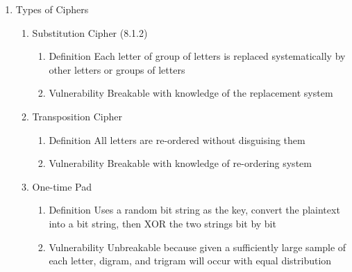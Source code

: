 \documentclass[a4paper,10pt]{article}
\begin{document}
\begin{enumerate}
  \item Types of Ciphers
    \begin{enumerate}
      \item Substitution Cipher (8.1.2)
        \begin{enumerate}
          \item Definition
            \newline Each letter of group of letters is replaced systematically by other letters or groups of letters
          \item Vulnerability
            \newline Breakable with knowledge of the replacement system
        \end{enumerate}
      \item Transposition Cipher
        \begin{enumerate}
          \item Definition
            \newline All letters are re-ordered without disguising them
          \item Vulnerability
            \newline Breakable with knowledge of re-ordering system
        \end{enumerate}
      \item One-time Pad
        \begin{enumerate}
          \item Definition
            \newline Uses a random bit string as the key, convert the plaintext into a bit string, then XOR the two strings bit by bit
          \item Vulnerability
            \newline Unbreakable because given a sufficiently large sample of each letter, digram, and trigram will occur with equal distribution
        \end{enumerate}
    \end{enumerate}
    

\end{enumerate}
\end{document}
